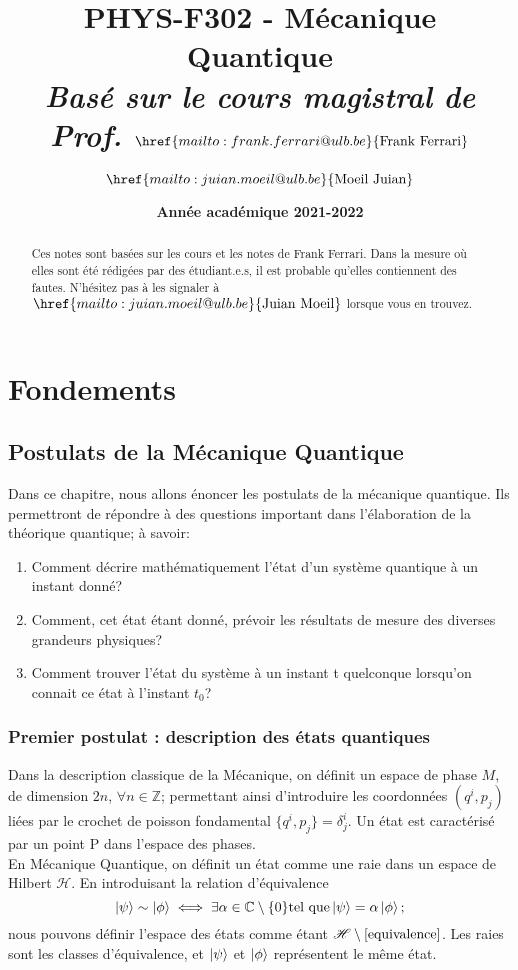 \documentclass{report}
\title{\textbf{PHYS-F302 - Mécanique Quantique} \\ \textit{Basé sur le cours magistral de Prof. $\href{mailto:frank.ferrari@ulb.be}{\text{Frank Ferrari}}$}}
\author{$\href{mailto:juian.moeil@ulb.be}{\text{Moeil Juian}}$}
\date{\textbf{Année académique 2021-2022}}
\numberwithin{equation}{part}
\begin{document}
\maketitle

\begin{abstract}
    Ces notes sont basées sur les cours et les notes de Frank Ferrari. Dans la mesure où elles sont été rédigées par des étudiant.e.s, il est probable qu'elles contiennent des fautes. N'hésitez pas à les signaler à $\href{mailto:juian.moeil@ulb.be}{\text{Juian Moeil}}$ lorsque vous en trouvez.
\end{abstract}
\newpage

\part{Fondements}

\chapter{Postulats de la Mécanique Quantique}

Dans ce chapitre, nous allons énoncer les postulats de la mécanique quantique. Ils permettront de répondre à des questions important dans l'élaboration de la théorique quantique; à savoir:
\begin{enumerate}
\item Comment décrire mathématiquement l'état d'un système quantique à un instant donné?
\item Comment, cet état étant donné, prévoir les résultats de mesure des diverses grandeurs physiques?
\item Comment trouver l'état du système à un instant t quelconque lorsqu'on connait  ce état à l'instant $t_0$?
\end{enumerate}

\section{Premier postulat : description des états quantiques}

Dans la description classique de la Mécanique, on définit un espace de phase $M$, de dimension $2n$, $\forall n\in\mathbb{Z}$; permettant ainsi d'introduire les coordonnées $\left(q^i,p_j\right)$ liées par le crochet de poisson fondamental $\{q^i,p_j\}=\delta^i_j$. Un état est caractérisé par un point P dans l'espace des phases.\\

En Mécanique Quantique, on définit un état comme une raie dans un espace de Hilbert $\mathcal{H}$. En introduisant la relation d'équivalence
\begin{equation}
\label{equivalence}
    \ket{\psi} \sim \ket{\phi} \iff \exists \alpha\in\mathbb{C}\setminus\{0\} \text{tel que} \ket{\psi}=\alpha\ket{\phi} ;
\end{equation}
nous pouvons définir l'espace des états comme étant $\mathcal{H}\setminus\ref{equivalence}$. Les raies sont les classes d'équivalence, et $\ket{\psi}$ et $\ket{\phi}$ représentent le même état.\\
\end{document}
